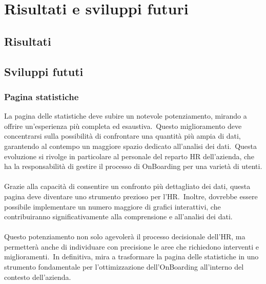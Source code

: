 \chapter{Risultati e sviluppi futuri}\label{chapter:Risultati_e_sviluppi_futuri}
%
%
\section{Risultati}\label{sec:cap_sec_subsec}
%
%
\section{Sviluppi fututi}\label{sec:cap_sec_subsec}
\subsection{Pagina statistiche}\label{sec:cap_sec_subsec}
La pagina delle statistiche deve subire un notevole potenziamento, mirando a offrire un'esperienza più completa ed esaustiva.\ 
Questo miglioramento deve concentrarsi sulla possibilità di confrontare una quantità più ampia di dati, 
garantendo al contempo un maggiore spazio dedicato all'analisi dei dati.\ 
Questa evoluzione si rivolge in particolare al personale del reparto HR dell'azienda, 
che ha la responsabilità di gestire il processo di OnBoarding per una varietà di utenti.
\\ \\
Grazie alla capacità di consentire un confronto più dettagliato dei dati, questa pagina deve diventare uno strumento prezioso per l'HR.\ 
Inoltre, dovrebbe essere possibile implementare un numero maggiore di grafici interattivi, che contribuiranno significativamente 
alla comprensione e all'analisi dei dati.
\\ \\
Questo potenziamento non solo agevolerà il processo decisionale dell'HR, ma permetterà anche di individuare con precisione le aree 
che richiedono interventi e miglioramenti.\ In definitiva, mira a trasformare la pagina delle statistiche in uno strumento 
fondamentale per l'ottimizzazione dell'OnBoarding all'interno del contesto dell'azienda.
%
